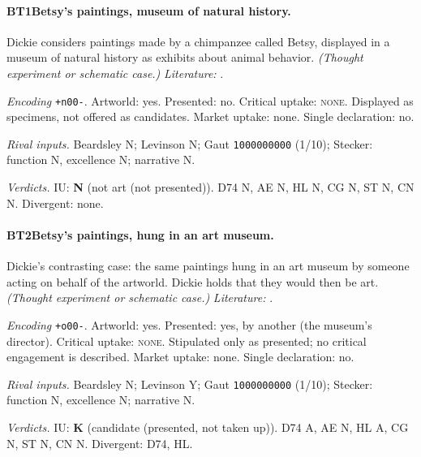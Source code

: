 \paragraph{BT1\enspace Betsy's paintings, museum of natural history.}
Dickie considers paintings made by a chimpanzee called Betsy, displayed in a museum of natural history as exhibits about animal behavior. \textit{(Thought experiment or schematic case.)} \textit{Literature:} \citet{Dickie1974}.\par
\noindent\textit{Encoding} \texttt{+n00-}. Artworld: yes. Presented: no. Critical uptake: \textsc{none}. Displayed as specimens, not offered as candidates. Market uptake: none. Single declaration: no.\par
\noindent\textit{Rival inputs.} Beardsley N; Levinson N; Gaut \texttt{1000000000} (1/10); Stecker: function N, excellence N; narrative N.\par
\noindent\textit{Verdicts.} IU: \textbf{N} (not art (not presented)). D74 N, AE N, HL N, CG N, ST N, CN N. Divergent: none.\par

\paragraph{BT2\enspace Betsy's paintings, hung in an art museum.}
Dickie's contrasting case: the same paintings hung in an art museum by someone acting on behalf of the artworld. Dickie holds that they would then be art. \textit{(Thought experiment or schematic case.)} \textit{Literature:} \citet{Dickie1974}.\par
\noindent\textit{Encoding} \texttt{+o00-}. Artworld: yes. Presented: yes, by another (the museum's director). Critical uptake: \textsc{none}. Stipulated only as presented; no critical engagement is described. Market uptake: none. Single declaration: no.\par
\noindent\textit{Rival inputs.} Beardsley N; Levinson Y; Gaut \texttt{1000000000} (1/10); Stecker: function N, excellence N; narrative N.\par
\noindent\textit{Verdicts.} IU: \textbf{K} (candidate (presented, not taken up)). D74 A, AE N, HL A, CG N, ST N, CN N. Divergent: D74, HL.\par

